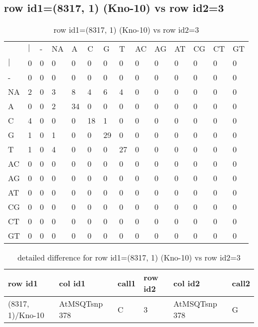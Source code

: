 \subsection{row id1=(8317, 1) (Kno-10) vs row id2=3}
\begin{center}
\begin{longtable}{|l|l|l|l|l|l|l|l|l|l|l|l|l|l|}
\caption{row id1=(8317, 1) (Kno-10) vs row id2=3} \label{table_dm506}\\
\hline
\\
\hline
&$|$&-&NA&A&C&G&T&AC&AG&AT&CG&CT&GT\\
$|$&0&0&0&0&0&0&0&0&0&0&0&0&0\\
-&0&0&0&0&0&0&0&0&0&0&0&0&0\\
NA&2&0&3&8&4&6&4&0&0&0&0&0&0\\
A&0&0&2&34&0&0&0&0&0&0&0&0&0\\
C&4&0&0&0&18&1&0&0&0&0&0&0&0\\
G&1&0&1&0&0&29&0&0&0&0&0&0&0\\
T&1&0&4&0&0&0&27&0&0&0&0&0&0\\
AC&0&0&0&0&0&0&0&0&0&0&0&0&0\\
AG&0&0&0&0&0&0&0&0&0&0&0&0&0\\
AT&0&0&0&0&0&0&0&0&0&0&0&0&0\\
CG&0&0&0&0&0&0&0&0&0&0&0&0&0\\
CT&0&0&0&0&0&0&0&0&0&0&0&0&0\\
GT&0&0&0&0&0&0&0&0&0&0&0&0&0\\
\hline
\end{longtable}
\end{center}

\begin{center}
\begin{longtable}{|l|l|l|l|l|l|}
\caption{detailed difference for row id1=(8317, 1) (Kno-10) vs row id2=3} \label{table_dm507}\\
\hline
row id1&col id1&call1&row id2&col id2&call2\\
\hline
(8317, 1)/Kno-10&AtMSQTsnp 378&C&3&AtMSQTsnp 378&G\\
\hline
\end{longtable}
\end{center}

